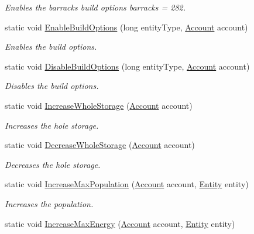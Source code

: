 \begin{DoxyCompactItemize}
\begin{DoxyCompactList}\small\item\em Enables the barracks build options barracks = 282. \end{DoxyCompactList}\item 
static void \hyperlink{classCore_1_1Models_1_1LogicRules_a16f9b1582af4ca59ac7d13044291b0bf}{Enable\+Build\+Options} (long entity\+Type, \hyperlink{classCore_1_1Models_1_1Account}{Account} account)
\begin{DoxyCompactList}\small\item\em Enables the build options. \end{DoxyCompactList}\item 
static void \hyperlink{classCore_1_1Models_1_1LogicRules_a6a1f94c43009b7a9238388281ffbadf7}{Disable\+Build\+Options} (long entity\+Type, \hyperlink{classCore_1_1Models_1_1Account}{Account} account)
\begin{DoxyCompactList}\small\item\em Disables the build options. \end{DoxyCompactList}\item 
static void \hyperlink{classCore_1_1Models_1_1LogicRules_a067a223a3eb6d870b2d05448d9967a22}{Increase\+Whole\+Storage} (\hyperlink{classCore_1_1Models_1_1Account}{Account} account)
\begin{DoxyCompactList}\small\item\em Increases the hole storage. \end{DoxyCompactList}\item 
static void \hyperlink{classCore_1_1Models_1_1LogicRules_af7b01bd5aae498990758b6e08542781f}{Decrease\+Whole\+Storage} (\hyperlink{classCore_1_1Models_1_1Account}{Account} account)
\begin{DoxyCompactList}\small\item\em Decreases the hole storage. \end{DoxyCompactList}\item 
static void \hyperlink{classCore_1_1Models_1_1LogicRules_ab9e45f139a56d49c34db56e9cf5b1e4c}{Increase\+Max\+Population} (\hyperlink{classCore_1_1Models_1_1Account}{Account} account, \hyperlink{classCore_1_1Models_1_1Entity}{Entity} entity)
\begin{DoxyCompactList}\small\item\em Increases the population. \end{DoxyCompactList}\item 
static void \hyperlink{classCore_1_1Models_1_1LogicRules_ab15c9eee68f915382f717968fe107d01}{Increase\+Max\+Energy} (\hyperlink{classCore_1_1Models_1_1Account}{Account} account, \hyperlink{classCore_1_1Models_1_1Entity}{Entity} entity)

\end{DoxyCompactItemize}
